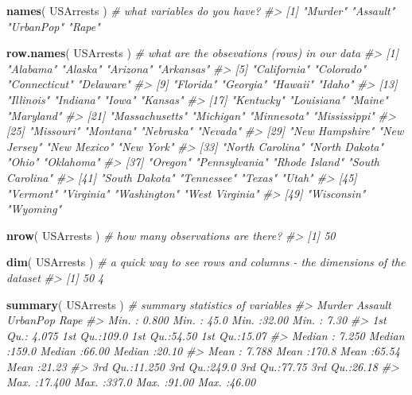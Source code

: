 \documentclass[]{book}
\newenvironment{Shaded}{\begin{snugshade}}{\end{snugshade}}
\newcommand{\CommentTok}[1]{\textcolor[rgb]{0.56,0.35,0.01}{\textit{#1}}}
\newcommand{\KeywordTok}[1]{\textcolor[rgb]{0.13,0.29,0.53}{\textbf{#1}}}
\newcommand{\NormalTok}[1]{#1}
\theoremstyle{definition}
\theoremstyle{definition}
\theoremstyle{definition}
\theoremstyle{remark}
\begin{document}
\begin{Shaded}
\begin{Highlighting}[]

\KeywordTok{names}\NormalTok{( USArrests )  }\CommentTok{# what variables do you have?}
\CommentTok{#> [1] "Murder"   "Assault"  "UrbanPop" "Rape"}

\KeywordTok{row.names}\NormalTok{( USArrests )   }\CommentTok{# what are the obsevations (rows) in our data}
\CommentTok{#>  [1] "Alabama"        "Alaska"         "Arizona"        "Arkansas"      }
\CommentTok{#>  [5] "California"     "Colorado"       "Connecticut"    "Delaware"      }
\CommentTok{#>  [9] "Florida"        "Georgia"        "Hawaii"         "Idaho"         }
\CommentTok{#> [13] "Illinois"       "Indiana"        "Iowa"           "Kansas"        }
\CommentTok{#> [17] "Kentucky"       "Louisiana"      "Maine"          "Maryland"      }
\CommentTok{#> [21] "Massachusetts"  "Michigan"       "Minnesota"      "Mississippi"   }
\CommentTok{#> [25] "Missouri"       "Montana"        "Nebraska"       "Nevada"        }
\CommentTok{#> [29] "New Hampshire"  "New Jersey"     "New Mexico"     "New York"      }
\CommentTok{#> [33] "North Carolina" "North Dakota"   "Ohio"           "Oklahoma"      }
\CommentTok{#> [37] "Oregon"         "Pennsylvania"   "Rhode Island"   "South Carolina"}
\CommentTok{#> [41] "South Dakota"   "Tennessee"      "Texas"          "Utah"          }
\CommentTok{#> [45] "Vermont"        "Virginia"       "Washington"     "West Virginia" }
\CommentTok{#> [49] "Wisconsin"      "Wyoming"}

\KeywordTok{nrow}\NormalTok{( USArrests )   }\CommentTok{# how many observations are there?}
\CommentTok{#> [1] 50}

\KeywordTok{dim}\NormalTok{( USArrests )    }\CommentTok{# a quick way to see rows and columns - the dimensions of the dataset}
\CommentTok{#> [1] 50  4}

\KeywordTok{summary}\NormalTok{( USArrests )   }\CommentTok{# summary statistics of variables}
\CommentTok{#>      Murder          Assault         UrbanPop          Rape      }
\CommentTok{#>  Min.   : 0.800   Min.   : 45.0   Min.   :32.00   Min.   : 7.30  }
\CommentTok{#>  1st Qu.: 4.075   1st Qu.:109.0   1st Qu.:54.50   1st Qu.:15.07  }
\CommentTok{#>  Median : 7.250   Median :159.0   Median :66.00   Median :20.10  }
\CommentTok{#>  Mean   : 7.788   Mean   :170.8   Mean   :65.54   Mean   :21.23  }
\CommentTok{#>  3rd Qu.:11.250   3rd Qu.:249.0   3rd Qu.:77.75   3rd Qu.:26.18  }
\CommentTok{#>  Max.   :17.400   Max.   :337.0   Max.   :91.00   Max.   :46.00}
\end{Highlighting}
\end{Shaded}
\end{document}
